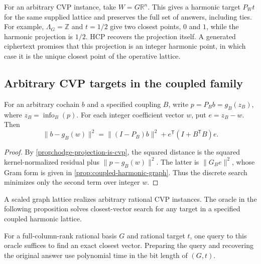 For an arbitrary CVP instance, take \(W=G\mathbb R^n\). This gives a harmonic
target \(P_Wt\) for the same supplied lattice and preserves the full set of
answers, including ties. For example, \(\Lambda_G=\mathbb Z\) and \(t=1/2\)
give two closest points, \(0\) and \(1\), while the harmonic projection is
\(1/2\). HCP recovers the projection itself. A generated ciphertext promises
that this projection is an integer harmonic point, in which case it is the
unique closest point of the operative lattice.

\subsection{Arbitrary CVP targets in the coupled family}

\begin{proposition}
\label{prop:coupled-cvp-residual}
For an arbitrary cochain \(b\) and a specified coupling \(B\), write
\(p=P_B b=g_B(z_B)\), where
\(z_B=\operatorname{info}_B(p)\). For each integer coefficient vector
\(w\), put \(e=z_B-w\). Then
\[
  \|b-g_B(w)\|^2
  =\|(I-P_B)b\|^2 + e^{\mathsf T}(I+B^{\mathsf T}B)e.
\]
\end{proposition}

\begin{proof}
By \cref{prop:hodge-projection-is-cvp}, the squared distance is the
squared kernel-normalized residual plus \(\|p-g_B(w)\|^2\). The latter is
\(\|G_Be\|^2\), whose Gram form is given in
\cref{prop:coupled-harmonic-graph}. Thus the discrete search minimizes
only the second term over integer \(w\).
\end{proof}

A scaled graph lattice realizes arbitrary rational CVP instances. The
oracle in the following proposition solves closest-vector search for any
target in a specified coupled harmonic lattice.

\begin{proposition}
\label{prop:unrestricted-coupled-cvp-lift}
For a full-column-rank rational basis \(G\) and rational target \(t\), one
query to this oracle suffices to find an exact closest vector. Preparing the
query and recovering the original answer use polynomial time in the bit
length of \((G,t)\).
\end{proposition}

